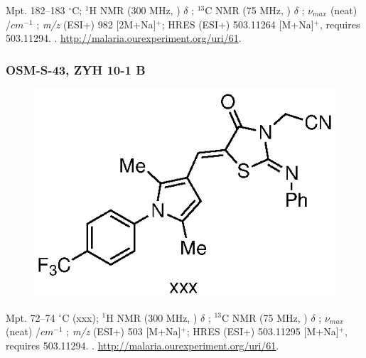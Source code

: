 \documentclass[12pt, a4paper,titlepage]{article}
\begin{document}
{%
Mpt. 182--183 $^\circ$C; 
$^1$H NMR (300 MHz, ) $\delta$ ; 
  $^{13}$C NMR (75 MHz, ) $\delta$ ; 
 $\nu_{max}$ (neat) /$cm^{-1}$ ; 
\emph{m/z} (ESI+) 982 [2M+Na]$^+$;  HRES (ESI+) 503.11264 [M+Na]$^+$,  requires 503.11294.
. 
\url{http://malaria.ourexperiment.org/uri/61}. 

\subsubsection*{OSM-S-43, ZYH 10-1 B}
\label{exp:ZYH10B}
	\begin{figure}[H]
	\begin{center}
	\includegraphics{exp/ZYH10B.eps}
	\end{center}
	\vspace{-25pt}	
	\end{figure}

Mpt. 72--74 $^\circ$C (xxx); 
$^1$H NMR (300 MHz, ) $\delta$ ; 
  $^{13}$C NMR (75 MHz, ) $\delta$ ; 
 $\nu_{max}$ (neat) /$cm^{-1}$ ; 
\emph{m/z} (ESI+) 503 [M+Na]$^+$; HRES (ESI+) 503.11295 [M+Na]$^+$,  requires 503.11294.
. 
\url{http://malaria.ourexperiment.org/uri/61}. 

}
\end{document}
